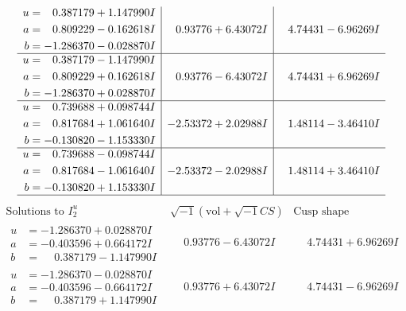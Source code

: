 \documentclass[1p]{elsarticle_modified}
\theoremstyle{definition}
\newcommand{\I}{\sqrt{-1}}
\begin{document}
$$\begin{array}{c|c|c}
\begin{aligned}
u &= \phantom{-}0.387179 + 1.147990 I \\
a &= \phantom{-}0.809229 - 0.162618 I \\
b &= -1.286370 - 0.028870 I\end{aligned}
 & \phantom{-}0.93776 + 6.43072 I & \phantom{-}4.74431 - 6.96269 I \\ \hline\begin{aligned}
u &= \phantom{-}0.387179 - 1.147990 I \\
a &= \phantom{-}0.809229 + 0.162618 I \\
b &= -1.286370 + 0.028870 I\end{aligned}
 & \phantom{-}0.93776 - 6.43072 I & \phantom{-}4.74431 + 6.96269 I \\ \hline\begin{aligned}
u &= \phantom{-}0.739688 + 0.098744 I \\
a &= \phantom{-}0.817684 + 1.061640 I \\
b &= -0.130820 - 1.153330 I\end{aligned}
 & -2.53372 + 2.02988 I & \phantom{-}1.48114 - 3.46410 I \\ \hline\begin{aligned}
u &= \phantom{-}0.739688 - 0.098744 I \\
a &= \phantom{-}0.817684 - 1.061640 I \\
b &= -0.130820 + 1.153330 I\end{aligned}
 & -2.53372 - 2.02988 I & \phantom{-}1.48114 + 3.46410 I\\
 \hline 
 \end{array}$$\newpage$$\begin{array}{c|c|c}  
\text{Solutions to }I^u_{2}& \I (\text{vol} + \sqrt{-1}CS) & \text{Cusp shape}\\
 \hline 
\begin{aligned}
u &= -1.286370 + 0.028870 I \\
a &= -0.403596 + 0.664172 I \\
b &= \phantom{-}0.387179 - 1.147990 I\end{aligned}
 & \phantom{-}0.93776 - 6.43072 I & \phantom{-}4.74431 + 6.96269 I \\ \hline\begin{aligned}
u &= -1.286370 - 0.028870 I \\
a &= -0.403596 - 0.664172 I \\
b &= \phantom{-}0.387179 + 1.147990 I\end{aligned}
 & \phantom{-}0.93776 + 6.43072 I & \phantom{-}4.74431 - 6.96269 I \\ \hline\begin{aligned}

\end{aligned}
\end{array}$$
\end{document}
